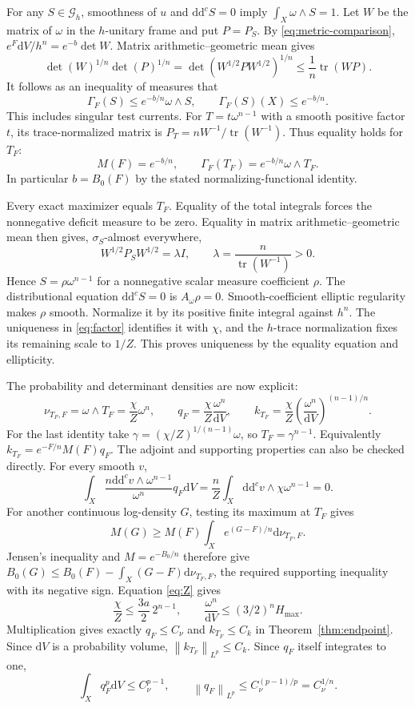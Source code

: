 \documentclass[11pt]{article}
\newcommand{\ddc}{\mathrm{d}\mathrm{d}^c}
\newcommand{\Ga}{\mathcal G_h}
\newcommand{\norm}[1]{\left\|#1\right\|}
\begin{document}
For any $S\in\Ga$, smoothness of $u$ and $\ddc S=0$ imply
$\int_X\omega\wedge S=1$. Let $W$ be the matrix of $\omega$ in the
$h$-unitary frame and put $P=P_S$. By \eqref{eq:metric-comparison},
$e^F\mathrm dV/h^n=e^{-b}\det W$. Matrix arithmetic--geometric mean gives
\[
 \det(W)^{1/n}\det(P)^{1/n}
 =\det(W^{1/2}PW^{1/2})^{1/n}\le\frac1n\operatorname{tr}(WP).
\]
It follows as an inequality of measures that
\[
 \Gamma_F(S)\le e^{-b/n}\omega\wedge S,
 \qquad \Gamma_F(S)(X)\le e^{-b/n}.
\]
This includes singular test currents. For $T=t\omega^{n-1}$ with a
smooth positive factor $t$, its trace-normalized matrix is
$P_T=nW^{-1}/\operatorname{tr}(W^{-1})$. Thus equality holds for $T_F$:
\begin{equation}\label{eq:exact}
 M(F)=e^{-b/n},\qquad
 \Gamma_F(T_F)=e^{-b/n}\omega\wedge T_F.
\end{equation}
In particular $b=B_0(F)$ by the stated normalizing-functional identity.

Every exact maximizer equals $T_F$. Equality of the total integrals
forces the nonnegative deficit measure to be zero. Equality in matrix
arithmetic--geometric mean then gives, $\sigma_S$-almost everywhere,
\[
 W^{1/2}P_SW^{1/2}=\lambda I,\qquad
 \lambda=\frac n{\operatorname{tr}(W^{-1})}>0.
\]
Hence $S=\rho\omega^{n-1}$ for a nonnegative scalar measure coefficient
$\rho$. The distributional equation $\ddc S=0$ is $A_\omega\rho=0$.
Smooth-coefficient elliptic regularity makes $\rho$ smooth. Normalize
it by its positive finite integral against $h^n$. The uniqueness in
\eqref{eq:factor} identifies it with $\chi$, and the $h$-trace
normalization fixes its remaining scale to $1/Z$. This proves
uniqueness by the equality equation and ellipticity.

The probability and determinant densities are now explicit:
\begin{equation}\label{eq:densities}
 \nu_{T_F,F}=\omega\wedge T_F=\frac\chi Z\omega^n,
 \qquad q_F=\frac\chi Z\frac{\omega^n}{\mathrm dV},\qquad
 k_{T_F}=\frac\chi Z
                 \left(\frac{\omega^n}{\mathrm dV}\right)^{(n-1)/n}.
\end{equation}
For the last identity take
$\gamma=(\chi/Z)^{1/(n-1)}\omega$, so $T_F=\gamma^{n-1}$.
Equivalently $k_{T_F}=e^{-F/n}M(F)q_F$.
The adjoint and supporting properties can also be checked directly.
For every smooth $v$,
\[
 \int_X\frac{n\ddc v\wedge\omega^{n-1}}{\omega^n}
                  q_F\mathrm dV
       =\frac nZ\int_X\ddc v\wedge\chi\omega^{n-1}=0.
\]
For another continuous log-density $G$, testing its maximum at $T_F$
gives
\[
 M(G)\ge M(F)\int_Xe^{(G-F)/n}\mathrm d\nu_{T_F,F}.
\]
Jensen's inequality and $M=e^{-B_0/n}$ therefore give
$B_0(G)\le B_0(F)-\int_X(G-F)\mathrm d\nu_{T_F,F}$,
the required supporting inequality with its negative sign.
Equation \eqref{eq:Z} gives
\[
 \frac\chi Z\le\frac{3a}2\,2^{n-1},\qquad
 \frac{\omega^n}{\mathrm dV}\le(3/2)^nH_{\max}.
\]
Multiplication gives exactly $q_F\le C_\nu$ and $k_{T_F}\le C_k$
in Theorem~\ref{thm:endpoint}. Since $\mathrm dV$ is a probability volume,
$\norm{k_{T_F}}_{L^p}\le C_k$. Since $q_F$ itself integrates to one,
\[
 \int_Xq_F^p\mathrm dV\le C_\nu^{p-1},\qquad
 \norm{q_F}_{L^p}\le C_\nu^{(p-1)/p}=C_\nu^{1/n}.
\]
\end{document}
